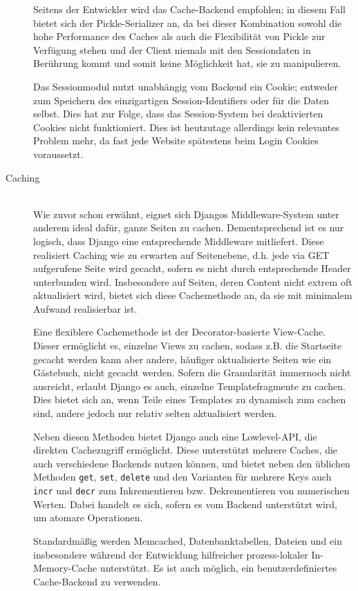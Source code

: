 \begin{description}
Seitens der Entwickler wird das Cache-Backend empfohlen; in diesem Fall bietet sich der
Pickle-Serializer an, da bei dieser Kombination sowohl die hohe Performance des Caches als auch die
Flexibilität von Pickle zur Verfügung stehen und der Client niemals mit den Sessiondaten in
Berührung kommt und somit keine Möglichkeit hat, sie zu manipulieren.

Das Sessionmodul nutzt unabhängig vom Backend ein Cookie; entweder zum Speichern des einzigartigen
Session-Identifiers oder für die Daten selbst. Dies hat zur Folge, dass das Session-System bei
deaktivierten Cookies nicht funktioniert. Dies ist heutzutage allerdings kein relevantes Problem
mehr, da fast jede Website spätestens beim Login Cookies voraussetzt.


\item[Caching] \hfill \\
Wie zuvor schon erwähnt, eignet sich Djangos Middleware-System unter anderem ideal dafür, ganze
Seiten zu cachen. Dementsprechend ist es nur logisch, dass Django eine entsprechende Middleware
mitliefert.  Diese realisiert Caching wie zu erwarten auf Seitenebene, d.h. jede via GET aufgerufene
Seite wird gecacht, sofern es nicht durch entsprechende Header unterbunden wird. Insbesondere auf
Seiten, deren Content nicht extrem oft aktualisiert wird, bietet sich diese Cachemethode an, da sie
mit minimalem Aufwand realisierbar ist.

Eine flexiblere Cachemethode ist der Decorator-basierte View-Cache. Dieser ermöglicht es, einzelne
Views zu cachen, sodass z.B. die Startseite gecacht werden kann aber andere, häufiger
aktualisierte Seiten wie ein Gästebuch, nicht gecacht werden. Sofern die Granularität
immernoch nicht ausreicht, erlaubt Django es auch, einzelne Templatefragmente zu cachen. Dies bietet
sich an, wenn Teile eines Templates zu dynamisch zum cachen sind, andere jedoch nur relativ selten
aktualisiert werden.

Neben diesen Methoden bietet Django auch eine Lowlevel-API, die direkten Cachezugriff ermöglicht.
Diese unterstützt mehrere Caches, die auch verschiedene Backends nutzen können, und bietet neben den
üblichen Methoden \lstinline{get}, \lstinline{set}, \lstinline{delete} und den Varianten für mehrere
Keys auch \lstinline{incr} und \lstinline{decr} zum Inkrementieren bzw. Dekrementieren von
numerischen Werten. Dabei handelt es sich, sofern es vom Backend unterstützt wird, um atomare
Operationen.

Standardmäßig werden Memcached, Datenbanktabellen, Dateien und ein insbesondere während der
Entwicklung hilfreicher prozess-lokaler In-Memory-Cache unterstützt. Es ist auch möglich, ein
benutzerdefiniertes Cache-Backend zu verwenden.



\end{description}

